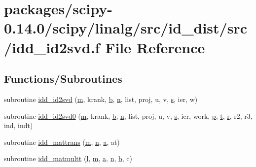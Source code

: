 \hypertarget{idd__id2svd_8f}{}\section{packages/scipy-\/0.14.0/scipy/linalg/src/id\+\_\+dist/src/idd\+\_\+id2svd.f File Reference}
\label{idd__id2svd_8f}
\subsection*{Functions/\+Subroutines}
\begin{DoxyCompactItemize}
\item 
subroutine \hyperlink{idd__id2svd_8f_a7755bef598d73518cb07857e7d351900}{idd\+\_\+id2svd} (\hyperlink{indexexpr_8h_ab72fdb4031d47b75ab26dd18a437bcdc}{m}, krank, \hyperlink{gen__mat5files_8m_a7b38767b3b6a8dae167e5afa4fc340b0}{b}, \hyperlink{indexexpr_8h_ab427e2e2b4d6cec55fa088ea2a692ace}{n}, list, proj, u, v, \hyperlink{indexexpr_8h_ae024b0db549122b44c349ae28ec990dc}{s}, ier, w)
\item 
subroutine \hyperlink{idd__id2svd_8f_a2952d0e07363215fd911da6ec1ec0bc1}{idd\+\_\+id2svd0} (\hyperlink{indexexpr_8h_ab72fdb4031d47b75ab26dd18a437bcdc}{m}, krank, \hyperlink{gen__mat5files_8m_a7b38767b3b6a8dae167e5afa4fc340b0}{b}, \hyperlink{indexexpr_8h_ab427e2e2b4d6cec55fa088ea2a692ace}{n}, list, proj, u, v, \hyperlink{indexexpr_8h_ae024b0db549122b44c349ae28ec990dc}{s}, ier, work, \hyperlink{indexexpr_8h_a2b8c103eb5bfc196fbc3d29923e28ac1}{p}, \hyperlink{indexexpr_8h_a01709998b82be3f34e0412206618d09d}{t}, \hyperlink{indexexpr_8h_ac434fd11cc2493608d8d91424d60c17e}{r}, r2, r3, ind, indt)
\item 
subroutine \hyperlink{idd__id2svd_8f_ac714d4a207b45ad056eb75ae7b3f5c72}{idd\+\_\+mattrans} (\hyperlink{indexexpr_8h_ab72fdb4031d47b75ab26dd18a437bcdc}{m}, \hyperlink{indexexpr_8h_ab427e2e2b4d6cec55fa088ea2a692ace}{n}, \hyperlink{gen__mat5files_8m_aae328bf20413f220e38aec4d95bfd6da}{a}, at)
\item 
subroutine \hyperlink{idd__id2svd_8f_a701ec7aa24e804bca10a93478089e519}{idd\+\_\+matmultt} (\hyperlink{indexexpr_8h_a88aacdaa46b76729743ee33ef8b95a58}{l}, \hyperlink{indexexpr_8h_ab72fdb4031d47b75ab26dd18a437bcdc}{m}, \hyperlink{gen__mat5files_8m_aae328bf20413f220e38aec4d95bfd6da}{a}, \hyperlink{indexexpr_8h_ab427e2e2b4d6cec55fa088ea2a692ace}{n}, \hyperlink{gen__mat5files_8m_a7b38767b3b6a8dae167e5afa4fc340b0}{b}, c)

\end{DoxyCompactItemize}
